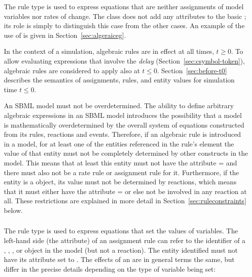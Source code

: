 The rule type \AlgebraicRule is used to express equations that are
neither assignments of model variables nor rates of change.  The
\AlgebraicRule class does not add any attributes to the basic
\Rule; its role is simply to distinguish this case from the other
cases.  An example of the use of \AlgebraicRule is given in
Section~\ref{sec:algeraiceg}.

In the context of a simulation, algebraic rules are in effect at
all times, $t \geq 0$.  To allow evaluating expressions that
involve the \emph{delay} 
(Section~\ref{sec:csymbol-token}), algebraic rules are considered
to apply also at $t \leq 0$.  Section~\ref{sec:before-t0}
describes the semantics of assignments, rules, and entity values
for simulation time $t \leq 0$.

An SBML model must not be overdetermined.  The ability to define
arbitrary algebraic expressions in an SBML model introduces the
possibility that a model is mathematically overdetermined by the
overall system of equations constructed from its rules, reactions
and events.  Therefore, if an algebraic rule is introduced in a
model, for at least one of the entities referenced in the rule's
 element the value of that entity must not be
completely determined by other constructs in the model.  This
means that at least this entity must not have the attribute
= and there must also not be a rate rule
or assignment rule for it.  Furthermore, if the entity is a
\Species object, its value must not be determined by reactions,
which means that it must either have the attribute
= or else not be involved in
any reaction at all.  These restrictions are explained in more
detail in Section~\ref{sec:ruleconstraints} below.


\subsubsection{}
\label{sec:assignmentrule}

The rule type \AssignmentRule is used to express equations that
set the values of variables.  The left-hand side (the
 attribute) of an assignment rule can refer to the
identifier of a \Species, \SpeciesReference, \Compartment, 
or \Parameter object in
the model (but not a reaction).  The entity identified must not
have its  attribute set to .  The effects of
an \AssignmentRule are in general terms the same, but differ in
the precise details depending on the type of variable being set:

